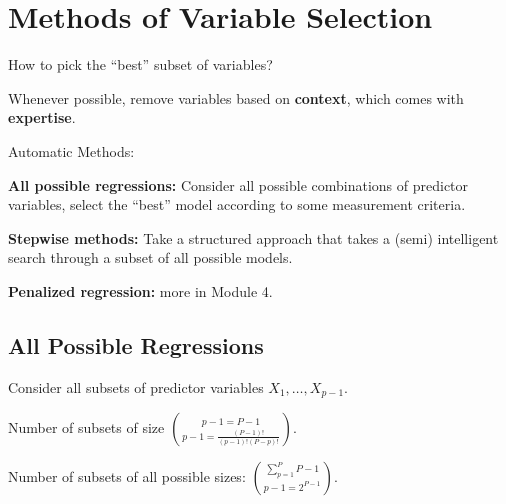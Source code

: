 \documentclass[12pt]{notes}
\begin{document}
\begin{minipage}[l][3cm][c]{\textwidth}
\end{minipage}

\section{Methods of Variable Selection}
How to pick the ``best'' subset of variables? 
\bi
\item Whenever possible, remove variables based on \textbf{context}, which comes with \textbf{expertise}.
\item Automatic Methods:
\bi
\item \textbf{All possible regressions:} Consider all possible combinations of predictor variables, select the ``best'' model according to some measurement criteria.  
\item \textbf{Stepwise methods:} Take a structured approach that takes a (semi) intelligent search through a subset of all possible models. 
\item \textbf{Penalized regression:} more in Module 4. 
\ei 
\ei

\subsection{All Possible Regressions}
Consider all subsets of predictor variables $X_1,  \ldots , X_{p-1}$. 

\bi
\item Number of subsets of size $p-1 = P-1 \choose p-1 = \frac{(P-1)!}{(p-1)!(P-p)!}$.
\item Number of subsets of all possible sizes: $\sum_{p=1}^P P-1 \choose p-1 = 2^{P-1}$.
\ei
\end{document}
